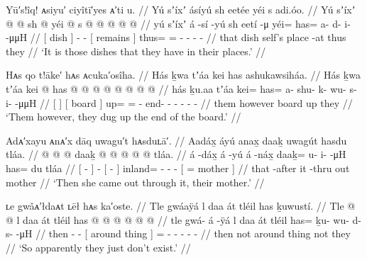 \ex\label{ex:92-42-have-dishes-in-place}%
%
\begingl
	\glpreamble	Yū′s!îq! ᴀsiyu′ ciyîtī′yes ᴀ′ti u. //
	\glpreamble	Yú sʼíxʼ ásíyú sh eetée yéi s adi.óo. //
	\gla	{} Yú sʼíxʼ {}  @ {} @ {}
		{} sh  @ {} {}
		yéi @ s @  @ {} @ {} @ {} @ {} //
	\glb	{} yú sʼíxʼ {} á -sí -yú
		{} sh eetí -μ {}
		yéi= has= a- d- i-  -μμH //
	\glc	{}[  dish {}]  - -
		{}[  remains \· {}]
		thus= = - - -  - //
	\gld	{} that dish {}  {} {}
		{} self’s place -at {}
		thus they  {} {} {} {} //
	\glft	‘It is those dishes that they have in their places.’
		//
\endgl
\xe

\ex\label{ex:92-43-dug-up-board}%
%
\begingl
	\glpreamble	Hᴀs qo t!āke′ hᴀs ᴀcuka′osîha. //
	\glpreamble	Hás ḵwa tʼáa kei has ashukawsiháa. //
	\gla	{} Hás {} ḵwa {} tʼáa {}
		kei @ has @  @ {} @ {} @ {} @ {} @ {} @ {} @ {} //
	\glb	{} hás {} ḵu.aa {} tʼáa {}
		kei= has= a- shu- k- wu- s- i-  -μμH //
	\glc	{}[  {}]  {}[ board {}]
		up= = - end- - - - -
			 - //
	\gld	{} them {} however {} board {}
		up they  {} {} {} {} {} {} {} //
	\glft	‘Them however, they dug up the end of the board.’
		//
\endgl
\xe

\ex\label{ex:92-44-then-mother-came-out}%
%
\begingl
	\glpreamble	Adᴀ′xayu ᴀnᴀ′x dāq uwagu′t hᴀsduʟā′. //
	\glpreamble	Aadáx̱ áyú anax̱ daaḵ uwagút hasdu tláa. //
	\gla	{}  @ {} {}  @ {}
		{}  @ {} {} daaḵ @  @ {} @ {} @ {}
		{}  @ {} tláa. {} //
	\glb	{} á -dáx̱ {} á -yú
		{} á -náx̱ {} daaḵ= u- i-  -μH
		{} has= du tláa {} //
	\glc	{}[  - {}]  -
		{}[  - {}] inland= - -
			 -
		{}[ =  mother {}] //
	\gld	{} that -after {}  {}
		{} it -thru {} out  {} {} {}
		{}  {} mother {} //
	\glft	‘Then she came out through it, their mother.’
		//
\endgl
\xe

\ex\label{ex:92-45-dont-exist}%
%
\begingl
	\glpreamble	ʟe gwâᴀ′łdaᴀt ʟēł hᴀs ka′oste. //
	\glpreamble	Tle gwáaÿá l daa át tléil has ḵuwustí. //
	\gla	Tle  @ {} @ {}
		{} l daa át {}
		tléil has @  @ {} @ {} @ {} @ {} @ {} //
	\glb	tle gwá- á -ÿá
		{} l daa át {}
		tléil has= ḵu- wu- d- s-  -μH //
	\glc	then -  -
		{}[  around thing {}]
		 = - - - -
			 - //
	\gld	then  {} {}
		{} not around thing {}
		not they  {} {} {} {} {} //
	\glft	‘So apparently they just don’t exist.’
		//
\endgl
\xe

